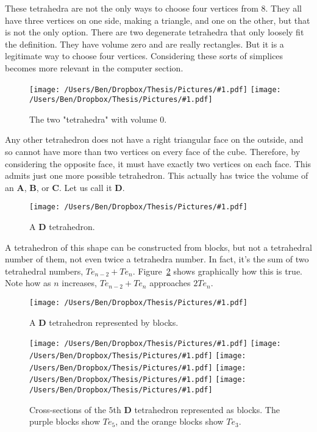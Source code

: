 \documentclass[12pt]{scrippsthesis}
\newcommand{\pic}[2]{\texttt{[image: /Users/Ben/Dropbox/Thesis/Pictures/\#1.pdf]}}
\theoremstyle{definition}
\theoremstyle{remark}
\theoremstyle{plain}
\begin{document}
These tetrahedra are not the only ways to choose four vertices from 8.  They all have three vertices on one side, making a triangle, and one on the other, but that is not the only option.  There are two degenerate tetrahedra that only loosely fit the definition.  They have volume zero and are really rectangles.  But it is a legitimate way to choose four vertices.  Considering these sorts of simplices becomes more relevant in the computer section.

\begin{figure}[H]
\centerline{\hfill
\pic{degen1}{width=1.5in}\hfill
\pic{degen2}{width=1.5in}\hfill
}
\caption{The two "tetrahedra" with volume 0.}
\end{figure}

Any other tetrahedron does not have a right triangular face on the outside, and so cannot have more than two vertices on every face of the cube.  Therefore, by considering the opposite face, it must have exactly two vertices on each face. This admits just one more possible tetrahedron.  This actually has twice the volume of an {\bf A}, {\bf B}, or {\bf C}.  Let us call it {\bf D}.

\begin{figure}[H]
\centerline{\hfill
\pic{D}{width=2in}\hfill
}
\caption{ A {\bf D} tetrahedron. }
\end{figure}

A tetrahedron of this shape can be constructed from blocks, but not a tetrahedral number of them, not even twice a tetrahedra number.  In fact, it's the sum of two tetrahedral numbers, $Te_{n-2}+Te_n$. Figure~\ref{fig:Dcross} shows graphically how this is true.  Note how as $n$ increases, $Te_{n-2}+Te_n$ approaches $2Te_n$.

\begin{figure}[H]
\centerline{\hfill
\pic{D-blocks}{width=2in}\hfill
}
\caption{ A {\bf D} tetrahedron represented by blocks.   }
\label{D}
\end{figure}

\begin{figure}[H]
\centerline{\hfill
\pic{Dblocks1}{width=.2\textwidth}\hfill
\pic{Dblocks2}{width=.2\textwidth}\hfill
\pic{Dblocks3}{width=.2\textwidth}\hfill
\pic{Dblocks4}{width=.2\textwidth}\hfill
\pic{Dblocks5}{width=.2\textwidth}\hfill
}
\caption{ Cross-sections of the $5$th {\bf D} tetrahedron represented as blocks.  The purple blocks show $Te_5$, and the orange blocks show $Te_3$. }
\label{fig:Dcross}
\end{figure}
\end{document}
